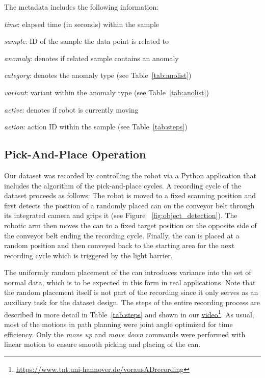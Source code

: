 \documentclass[journal]{IEEEtran}
\newenvironment{packed_enum}{
\begin{itemize}
  \setlength{\itemsep}{3pt}
  \setlength{\parskip}{0pt}
  \setlength{\parsep}{0pt}
}{\end{itemize}}
\begin{document}
The metadata includes the following information:
\begin{packed_enum}
    \item \textit{time}: elapsed time (in seconds) within the sample
    \item \textit{sample}: ID of the sample the data point is related to
    \item \textit{anomaly}: denotes if related sample contains an anomaly
    \item \textit{category}: denotes the anomaly type (see Table~\ref{tab:anolist})
    \item \textit{variant}: variant within the anomaly type (see Table~\ref{tab:anolist})
    \item \textit{active}: denotes if robot is currently moving
    \item \textit{action}: action ID within the sample (see Table~\ref{tab:steps})
\end{packed_enum}


\subsection{Pick-And-Place Operation}
\label{pickplace}
Our dataset was recorded by controlling the robot via a Python application that includes the algorithm of the pick-and-place cycles.
A recording cycle of the dataset proceeds as follows: The robot is moved to a fixed scanning position and first detects the position of a randomly placed can on the conveyor belt through its integrated camera and grips it (see Figure ~\ref{fig:object_detection}).
The robotic arm then moves the can to a fixed target position on the opposite side of the conveyor belt ending the recording cycle.
Finally, the can is placed at a random position and then conveyed back to the starting area for the next recording cycle which is triggered by the light barrier.

The {uniformly} random placement of the can introduces variance into the set of normal data, which is to be expected in this form in real applications.
Note that the random placement itself is not part of the recording since it only serves as an auxiliary task for the dataset design.
The steps of the entire recording process are described in more detail in Table~\ref{tab:steps} {and shown in our \href{
https://www.tnt.uni-hannover.de/vorausADrecording}{video}}\footnote{\href{
https://www.tnt.uni-hannover.de/vorausADrecording}{
https://www.tnt.uni-hannover.de/vorausADrecording}}.
As usual, most of the motions in path planning were joint angle optimized for time efficiency.
Only the \textit{move up} and \textit{move down} commands were performed with linear motion to ensure smooth picking and placing of the can.
\end{document}
